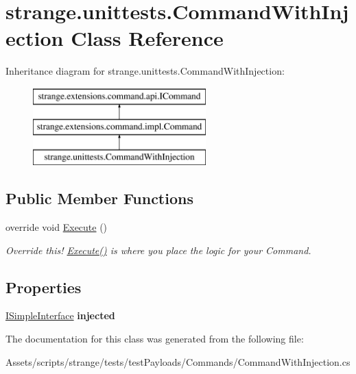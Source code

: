 \hypertarget{classstrange_1_1unittests_1_1_command_with_injection}{\section{strange.\-unittests.\-Command\-With\-Injection Class Reference}
\label{classstrange_1_1unittests_1_1_command_with_injection}
}
Inheritance diagram for strange.\-unittests.\-Command\-With\-Injection\-:\begin{figure}[H]
\begin{center}
\leavevmode
\includegraphics[height=3.000000cm]{classstrange_1_1unittests_1_1_command_with_injection}
\end{center}
\end{figure}
\subsection*{Public Member Functions}
\begin{DoxyCompactItemize}
\item 
\hypertarget{classstrange_1_1unittests_1_1_command_with_injection_a94e5f317f8cbc566e0e1757e156265bf}{override void \hyperlink{classstrange_1_1unittests_1_1_command_with_injection_a94e5f317f8cbc566e0e1757e156265bf}{Execute} ()}\label{classstrange_1_1unittests_1_1_command_with_injection_a94e5f317f8cbc566e0e1757e156265bf}

\begin{DoxyCompactList}\small\item\em Override this! {\ttfamily \hyperlink{classstrange_1_1unittests_1_1_command_with_injection_a94e5f317f8cbc566e0e1757e156265bf}{Execute()}} is where you place the logic for your Command. \end{DoxyCompactList}\end{DoxyCompactItemize}
\subsection*{Properties}
\begin{DoxyCompactItemize}
\item 
\hypertarget{classstrange_1_1unittests_1_1_command_with_injection_ac261e567c77988110ecd873be820434d}{\hyperlink{interfacestrange_1_1unittests_1_1_i_simple_interface}{I\-Simple\-Interface} {\bfseries injected}}\label{classstrange_1_1unittests_1_1_command_with_injection_ac261e567c77988110ecd873be820434d}

\end{DoxyCompactItemize}


The documentation for this class was generated from the following file\-:\begin{DoxyCompactItemize}
\item 
Assets/scripts/strange/tests/test\-Payloads/\-Commands/Command\-With\-Injection.\-cs\end{DoxyCompactItemize}
